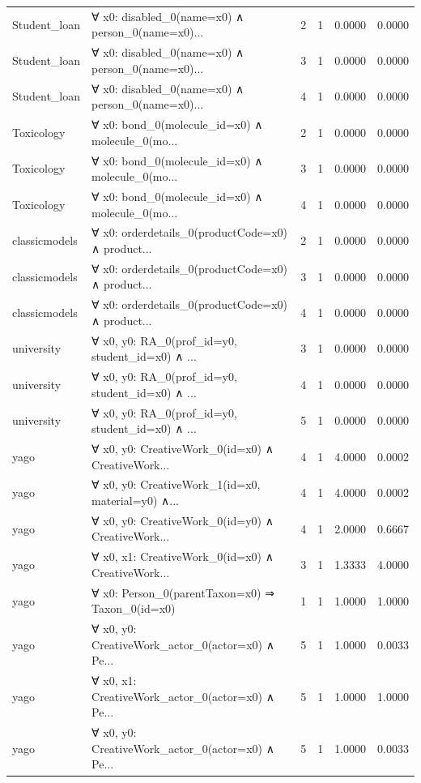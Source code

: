 \documentclass[11pt,a4paper]{article}
\begin{document}
\begin{table}[h!]
\begin{longtable}{|l|p{6cm}|c|c|c|c|}
Student_loan & ∀ x0: disabled\_0(name=x0) ∧ person\_0(name=x0)... & 2 & 1 & 0.0000 & 0.0000 \\
Student_loan & ∀ x0: disabled\_0(name=x0) ∧ person\_0(name=x0)... & 3 & 1 & 0.0000 & 0.0000 \\
Student_loan & ∀ x0: disabled\_0(name=x0) ∧ person\_0(name=x0)... & 4 & 1 & 0.0000 & 0.0000 \\
Toxicology & ∀ x0: bond\_0(molecule\_id=x0) ∧ molecule\_0(mo... & 2 & 1 & 0.0000 & 0.0000 \\
Toxicology & ∀ x0: bond\_0(molecule\_id=x0) ∧ molecule\_0(mo... & 3 & 1 & 0.0000 & 0.0000 \\
Toxicology & ∀ x0: bond\_0(molecule\_id=x0) ∧ molecule\_0(mo... & 4 & 1 & 0.0000 & 0.0000 \\
classicmodels & ∀ x0: orderdetails\_0(productCode=x0) ∧ product... & 2 & 1 & 0.0000 & 0.0000 \\
classicmodels & ∀ x0: orderdetails\_0(productCode=x0) ∧ product... & 3 & 1 & 0.0000 & 0.0000 \\
classicmodels & ∀ x0: orderdetails\_0(productCode=x0) ∧ product... & 4 & 1 & 0.0000 & 0.0000 \\
university & ∀ x0, y0: RA\_0(prof\_id=y0, student\_id=x0) ∧ ... & 3 & 1 & 0.0000 & 0.0000 \\
university & ∀ x0, y0: RA\_0(prof\_id=y0, student\_id=x0) ∧ ... & 4 & 1 & 0.0000 & 0.0000 \\
university & ∀ x0, y0: RA\_0(prof\_id=y0, student\_id=x0) ∧ ... & 5 & 1 & 0.0000 & 0.0000 \\
yago & ∀ x0, y0: CreativeWork\_0(id=x0) ∧ CreativeWork... & 4 & 1 & 4.0000 & 0.0002 \\
yago & ∀ x0, y0: CreativeWork\_1(id=x0, material=y0) ∧... & 4 & 1 & 4.0000 & 0.0002 \\
yago & ∀ x0, y0: CreativeWork\_0(id=y0) ∧ CreativeWork... & 4 & 1 & 2.0000 & 0.6667 \\
yago & ∀ x0, x1: CreativeWork\_0(id=x0) ∧ CreativeWork... & 3 & 1 & 1.3333 & 4.0000 \\
yago & ∀ x0: Person\_0(parentTaxon=x0) ⇒ Taxon\_0(id=x0) & 1 & 1 & 1.0000 & 1.0000 \\
yago & ∀ x0, y0: CreativeWork\_actor\_0(actor=x0) ∧ Pe... & 5 & 1 & 1.0000 & 0.0033 \\
yago & ∀ x0, x1: CreativeWork\_actor\_0(actor=x0) ∧ Pe... & 5 & 1 & 1.0000 & 1.0000 \\
yago & ∀ x0, y0: CreativeWork\_actor\_0(actor=x0) ∧ Pe... & 5 & 1 & 1.0000 & 0.0033 \\

\end{longtable}
\end{table}
\end{document}
